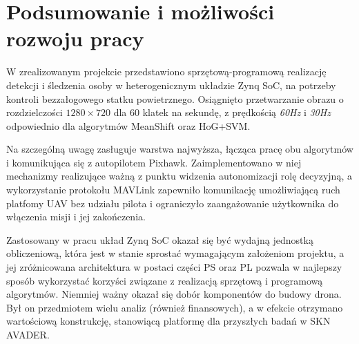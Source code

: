 \chapter{Podsumowanie i możliwości rozwoju pracy}

W zrealizowanym projekcie przedstawiono sprzętową-programową realizację detekcji i śledzenia osoby w heterogenicznym układzie Zynq SoC, na potrzeby kontroli bezzałogowego statku powietrznego. 
Osiągnięto przetwarzanie obrazu o rozdzielczości $1280\times 720$ dla 60 klatek na sekundę, z prędkością \textit{60Hz} i \textit{30Hz} odpowiednio dla algorytmów MeanShift oraz HoG+SVM.

Na szczególną uwagę zasługuje warstwa najwyższa, łącząca pracę obu algorytmów i komunikująca się z autopilotem Pixhawk. Zaimplementowano w niej mechanizmy realizujące ważną z punktu widzenia autonomizacji rolę decyzyjną, a wykorzystanie protokołu MAVLink zapewniło komunikację umożliwiającą ruch platfomy UAV bez udziału pilota i ograniczyło zaangażowanie użytkownika do włączenia misji i jej zakończenia.

Zastosowany w pracu układ Zynq SoC okazał się być wydajną jednostką obliczeniową, która jest w stanie sprostać wymagającym założeniom projektu, a jej zróżnicowana architektura w postaci części PS oraz PL pozwala w najlepszy sposób wykorzystać korzyści związane z realizacją sprzętową i programową algorytmów.
Niemniej ważny okazał się dobór komponentów do budowy drona. Był on przedmiotem wielu analiz (również finansowych), a w efekcie otrzymano wartościową konstrukcję, stanowiącą platformę dla przyszłych badań w SKN AVADER.




